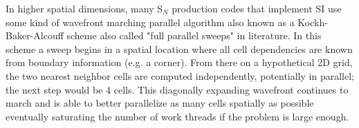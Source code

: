 In higher spatial dimensions, many S$_N$ production codes that implement SI use some kind of wavefront marching parallel algorithm also known as a Kockh-Baker-Alcouff scheme \cite{baker_kba_2017, colomer_parallel_2013} also called "full parallel sweeps" in literature.
In this scheme a sweep begins in a spatial location where all cell dependencies are known from boundary information (e.g. a corner).
From there on a hypothetical 2D grid, the two nearest neighbor cells are computed independently, potentially in parallel; the next step would be 4 cells.
This diagonally expanding wavefront continues to march and is able to better parallelize as many cells spatially as possible eventually saturating the number of work threads if the problem is large enough.




